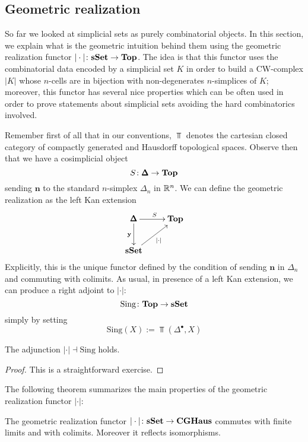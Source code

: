 \begin{refsection}
\section{Geometric realization}

So far we looked at simplicial sets as purely combinatorial objects. In this section, we explain what is the geometric intuition behind them using the geometric realization functor $|\cdot| \colon \mathbf{s\,\!\mathbf{Set}} \to \mathbf{Top}$. The idea is that this functor uses the combinatorial data encoded by a simplicial set $K$ in order to build a CW-complex $|K|$ whose $n$-cells are in bijection with non-degenerates $n$-simplices of $K$; moreover, this functor has several nice properties which can be often used in order to prove statements about simplicial sets avoiding the hard combinatorics involved.

Remember first of all that in our conventions, $\Top$ denotes the cartesian closed category of compactly generated and Hausdorff topological spaces. Observe then that we have a cosimplicial object
\[
S \colon \pmb{\Delta} \to \mathbf{Top}
\]
sending $\mathbf n$ to the standard $n$-simplex $\Delta_n$ in $\mathbb{R}^n$. We can define the geometric realization as the left Kan extension
\[
\xymatrix{
\SDelta \ar[r]^{S} \ar[d]_{\mathbf y} & \Top \\
\sSet \ar[ur]_{|\cdot|}
}
\]
Explicitly, this is the unique functor defined by the condition of sending $\mathbf n$ in $\Delta_n$ and commuting with colimits. As usual, in presence of a left Kan extension, we can produce a right adjoint to $|\cdot|$:
\[
\mathrm{Sing} \colon \mathbf{Top} \to \mathbf{s\,\!\mathbf{Set}}
\]
simply by setting
\[
\mathrm{Sing}(X) := \Top(\Delta^{\bullet}, X)
\]

\begin{lemma}
The adjunction $|\cdot| \dashv \mathrm{Sing}$ holds.
\end{lemma}

\begin{proof}
This is a straightforward exercise.
\end{proof}

The following theorem summarizes the main properties of the geometric realization functor $|\cdot|$:

\begin{thm} \label{thm exactness of geometric realization}
The geometric realization functor $| \cdot | \colon \mathbf{s\,\!\mathbf{Set}} \to \mathbf{CGHaus}$ commutes with finite limits and with colimits. Moreover it reflects isomorphisms.
\end{thm}


\end{refsection}
